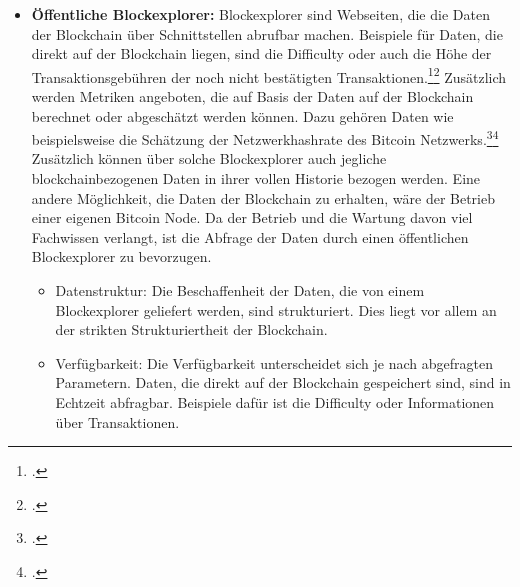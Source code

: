 \begin{itemize}
    \item \textbf{Öffentliche Blockexplorer: }Blockexplorer sind Webseiten, die die Daten der Blockchain über Schnittstellen
    abrufbar machen. Beispiele für Daten, die direkt auf der Blockchain liegen, sind die Difficulty oder auch die Höhe der
    Transaktionsgebühren der noch nicht bestätigten
    Transaktionen.\footcite[Vgl.][]{bitcoin2021getdifficulty}\footcite[Vgl.][]{bitcoin2021getrawmempool} Zusätzlich werden
    Metriken angeboten, die auf Basis der Daten auf der Blockchain berechnet oder abgeschätzt werden können. Dazu gehören
    Daten wie beispielsweise die Schätzung der Netzwerkhashrate des Bitcoin
    Netzwerks.\footcite[Vgl.][]{blockchain2021total}\footcite[Vgl.][]{blockchain2021api} Zusätzlich können über solche
    Blockexplorer auch jegliche blockchainbezogenen Daten in ihrer vollen Historie bezogen werden. Eine andere Möglichkeit,
    die Daten der Blockchain zu erhalten, wäre der Betrieb einer eigenen Bitcoin Node. Da der Betrieb und die Wartung davon
    viel Fachwissen verlangt, ist die Abfrage der Daten durch einen öffentlichen Blockexplorer zu bevorzugen.
    \begin{itemize}
        \item Datenstruktur: Die Beschaffenheit der Daten, die von einem Blockexplorer geliefert werden, sind strukturiert.
        Dies liegt vor allem an der strikten Strukturiertheit der Blockchain.
        \item Verfügbarkeit: Die Verfügbarkeit unterscheidet sich je nach abgefragten Parametern. Daten, die direkt auf
        der Blockchain gespeichert sind, sind in Echtzeit abfragbar. Beispiele dafür ist die Difficulty oder Informationen
        über Transaktionen.
        

\end{itemize}
\end{itemize}
